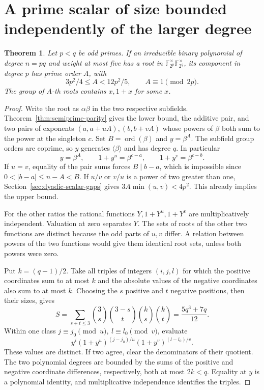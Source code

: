 \documentclass[11pt]{article}
\newtheorem{theorem}{Theorem}
\newcommand{\ord}{\operatorname{ord}}
\begin{document}
\section{A prime scalar of size bounded independently of the larger degree}
\label{sec:scalar-independent-bound}
\begin{theorem}\label{thm:scalar-independent-bound}
Let \(p<q\) be odd primes. If an irreducible binary polynomial of
degree \(n=pq\) and weight at most five has a root in
\(\mathbb F_{2^p}^{\times}\mathbb F_{2^q}^{\times}\), its component in
degree \(p\) has prime order \(A\), with
\[
       3p^2/4\le A<12p^2/5,\qquad A\equiv1\pmod{2p}.
\]
The group of \(A\)-th roots contains \(x,1+x\) for some \(x\).
\end{theorem}
\begin{proof}
Write the root as \(\alpha\beta\) in the two respective subfields.
Theorem~\ref{thm:semiprime-parity} gives the lower bound, the additive
pair, and two pairs of exponents \((a,a+uA),(b,b+vA)\) whose powers
of \(\beta\) both sum to the power at the singleton \(c\).
Set \(B=\ord(\beta)\) and \(y=\beta^A\). The subfield group orders are
coprime, so \(y\) generates \(\langle\beta\rangle\) and has degree \(q\).
In particular
\[
     y=\beta^A,\qquad 1+y^u=\beta^{c-a},\qquad 1+y^v=\beta^{c-b}.
\]
If \(u=v\), equality of the pair sums forces \(B\mid b-a\), which is
impossible since \(0<|b-a|\le n-A<B\). If \(u/v\) or \(v/u\) is a
power of two greater than one, Section~\ref{sec:dyadic-scalar-gaps}
gives \(3A\min(u,v)<4p^2\). This already implies the upper bound.

For the other ratios the rational functions
\(Y,1+Y^u,1+Y^v\) are multiplicatively independent. Valuation at
zero separates \(Y\). The sets of roots of the other two functions
are distinct because the odd parts of \(u,v\) differ. A relation
between powers of the two functions would give them identical root
sets, unless both powers were zero.

Put \(k=(q-1)/2\). Take all triples of integers \((i,j,l)\) for which
the positive coordinates sum to at most \(k\) and the absolute values
of the negative coordinates also sum to at most \(k\). Choosing the
\(s\) positive and \(t\) negative positions, then their sizes, gives
\[
 S=\sum_{s+t\le3}\binom3s\binom{3-s}t\binom ks\binom kt
   =\frac{5q^3+7q}{12}.
\]
Within one class \(j\equiv j_0\pmod u,\ l\equiv l_0\pmod v\), evaluate
\[
  y^i(1+y^u)^{(j-j_0)/u}(1+y^v)^{(l-l_0)/v}.
\]
These values are distinct. If two agree, clear the denominators of
their quotient. The two polynomial degrees are bounded by the sums
of the positive and negative coordinate differences, respectively,
both at most \(2k<q\). Equality at \(y\) is a polynomial identity,
and multiplicative independence identifies the triples.


\end{proof}
\end{document}

